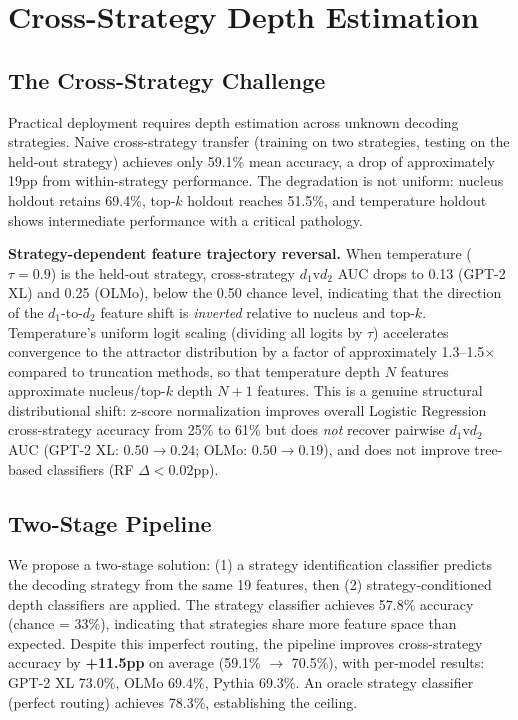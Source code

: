 \documentclass[11pt,a4paper]{article}
\begin{document}
\section{Cross-Strategy Depth Estimation}
\label{sec:cross_strategy}

\subsection{The Cross-Strategy Challenge}

Practical deployment requires depth estimation across unknown decoding strategies. Naive cross-strategy transfer (training on two strategies, testing on the held-out strategy) achieves only 59.1\% mean accuracy, a drop of approximately 19pp from within-strategy performance. The degradation is not uniform: nucleus holdout retains 69.4\%, top-$k$ holdout reaches 51.5\%, and temperature holdout shows intermediate performance with a critical pathology.

\textbf{Strategy-dependent feature trajectory reversal.} When temperature ($\tau{=}0.9$) is the held-out strategy, cross-strategy $d_1$v$d_2$ AUC drops to 0.13 (GPT-2 XL) and 0.25 (OLMo), below the 0.50 chance level, indicating that the direction of the $d_1$-to-$d_2$ feature shift is \textit{inverted} relative to nucleus and top-$k$. Temperature's uniform logit scaling (dividing all logits by $\tau$) accelerates convergence to the attractor distribution by a factor of approximately 1.3--1.5$\times$ compared to truncation methods, so that temperature depth $N$ features approximate nucleus/top-$k$ depth $N{+}1$ features. This is a genuine structural distributional shift: z-score normalization improves overall Logistic Regression cross-strategy accuracy from 25\% to 61\% but does \textit{not} recover pairwise $d_1$v$d_2$ AUC (GPT-2 XL: $0.50 \to 0.24$; OLMo: $0.50 \to 0.19$), and does not improve tree-based classifiers (RF $\Delta < 0.02$pp).

\subsection{Two-Stage Pipeline}

We propose a two-stage solution: (1) a strategy identification classifier predicts the decoding strategy from the same 19 features, then (2) strategy-conditioned depth classifiers are applied. The strategy classifier achieves 57.8\% accuracy (chance = 33\%), indicating that strategies share more feature space than expected. Despite this imperfect routing, the pipeline improves cross-strategy accuracy by \textbf{+11.5pp} on average (59.1\% $\to$ 70.5\%), with per-model results: GPT-2 XL 73.0\%, OLMo 69.4\%, Pythia 69.3\%. An oracle strategy classifier (perfect routing) achieves 78.3\%, establishing the ceiling.
\end{document}
